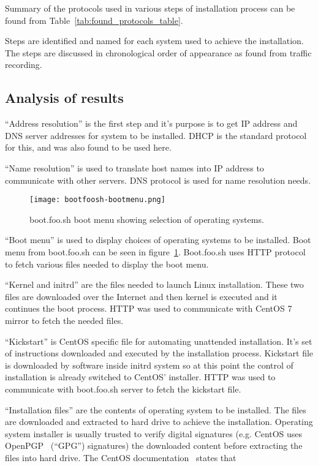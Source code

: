 Summary of the protocols used in various steps of installation process
can be found from Table~\ref{tab:found_protocols_table}.

Steps are identified and named for each system used to achieve the
installation. The steps are discussed in chronological order of
appearance as found from traffic recording.

\subsection{Analysis of results}

``Address resolution'' is the first step and it's purpose is to get IP
address and DNS server addresses for system to be installed. DHCP is
the standard protocol for this, and was also found to be used here.

``Name resolution'' is used to translate host names into IP address to
communicate with other servers. DNS protocol is used for name
resolution needs.

\begin{figure}[h]
  \texttt{[image: bootfoosh-bootmenu.png]}
  \caption{boot.foo.sh boot menu showing selection of operating
    systems.\label{fig:bootmenu}}
\end{figure}

``Boot menu'' is used to display choices of operating systems to be
installed. Boot menu from boot.foo.sh can be seen in
figure~\ref{fig:bootmenu}. Boot.foo.sh uses HTTP protocol to fetch
various files needed to display the boot menu.

``Kernel and initrd'' are the files needed to launch Linux
installation. These two files are downloaded over the Internet and
then kernel is executed and it continues the boot process. HTTP was
used to communicate with CentOS 7 mirror to fetch the needed files.

``Kickstart'' is CentOS specific file for automating unattended
installation. It's set of instructions downloaded and executed by the
installation process. Kickstart file is downloaded by software inside
initrd system so at this point the control of installation is already
switched to CentOS' installer. HTTP was used to communicate with
boot.foo.sh server to fetch the kickstart file.

``Installation files'' are the contents of operating system to be
installed. The files are downloaded and extracted to hard drive to
achieve the installation. Operating system installer is usually
trusted to verify digital signatures (e.g. CentOS uses
OpenPGP~\cite{RFC4880} (``GPG'') signatures) the downloaded content
before extracting the files into hard drive. The CentOS
documentation~\cite{centos-gpg} states that

